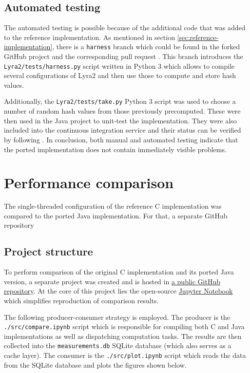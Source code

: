 \subsection{Automated testing}
\label{sec:automated-testing}

The automated testing is possible because of the additional code that was added to the reference implementation. As mentioned in section \ref{sec:reference-implementation}, there is a \verb|harness| branch which could be found in the forked GitHub project \cite{github:2017:lyra-copy} and the corresponding pull request \cite{github:2017:lyra-pr}. This branch introduces the \verb|Lyra2/tests/harness.py| script written in Python 3 which allows to compile several configurations of Lyra2 and then use those to compute and store hash values.

Additionally, the \verb|Lyra2/tests/take.py| Python 3 script was used to choose a number of random hash values from those previously precomputed. These were then used in the Java project to unit-test the implementation. They were also included into the continuous integration service and their status can be verified by following \cite{travis:2017:lyra}. In conclusion, both manual and automated testing indicate that the ported implementation does not contain immediately visible problems.

\section{Performance comparison}

The single-threaded configuration of the reference C implementation was compared to the ported Java implementation. For that, a separate GitHub repository 

\subsection{Project structure}

To perform comparison of the original C implementation and its ported Java version, a separate project was created and is hosted in \href{https://github.com/all3fox/lyra2-compare}{a public GitHub repository}. At the core of this project lies the open-source \href{https://jupyter.org/}{Jupyter Notebook} which simplifies reproduction of comparison results.

The following producer-consumer strategy is employed. The producer is the \texttt{./src/compare.ipynb} script which is responsible for compiling both C and Java implementations as well as dispatching computation tasks. The results are then collected into the \texttt{measurements.db} SQLite database (which also serves as a cache layer). The consumer is the \texttt{./src/plot.ipynb} script which reads the data from the SQLite database and plots the figures shown below.

